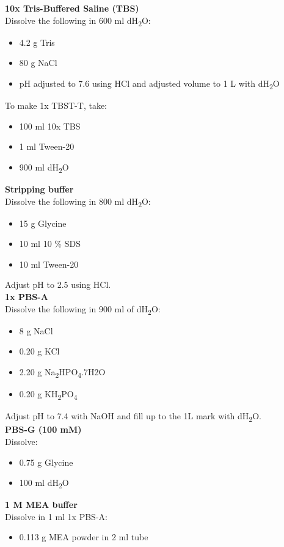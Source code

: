 \noindent
\textbf{10x Tris-Buffered Saline (TBS)} \\
Dissolve the following in 600 ml dH\textsubscript{2}O:
\begin{itemize}
\item 4.2 g Tris
\item 80 g NaCl   
\item pH adjusted to 7.6 using HCl and adjusted volume to 1 L with dH\textsubscript{2}O
\end{itemize}
\noindent
To make 1x TBST-T, take:
\begin{itemize}
\item 100 ml 10x TBS 
\item 1 ml Tween-20
\item 900 ml dH\textsubscript{2}O
\end{itemize}

\noindent
\textbf{Stripping buffer} \\
Dissolve the following in 800 ml dH\textsubscript{2}O:
\begin{itemize}
\item 15 g Glycine
\item 10 ml 10 \% SDS 
\item 10 ml Tween-20
\end{itemize}
Adjust pH to 2.5 using HCl. \\
 
\noindent
\textbf{1x PBS-A} \\
Dissolve the following in 900 ml of dH\textsubscript{2}O:
\begin{itemize}
\item 8 g NaCl 
\item 0.20 g KCl 
\item 2.20 g Na\textsubscript{2}HPO\textsubscript{4}.7H2O
\item 0.20 g KH\textsubscript{2}PO\textsubscript{4} 
\end{itemize}
Adjust pH to 7.4 with NaOH and fill up to the 1L mark with dH\textsubscript{2}O.\\

\noindent
\textbf{PBS-G (100 mM)} \\
Dissolve:
\begin{itemize}
\item 0.75 g Glycine 
\item 100 ml dH\textsubscript{2}O
\end{itemize}

\noindent
\textbf{1 M MEA buffer} \\
Dissolve in 1 ml 1x PBS-A:
\begin{itemize}
\item 0.113 g MEA powder in 2 ml tube
\end{itemize}

